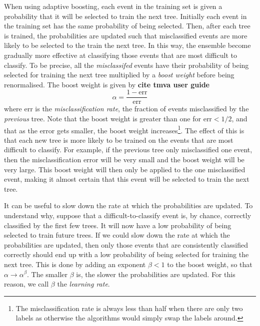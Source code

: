 \documentclass[11pt]{cuthesis}
\begin{document}
When using adaptive boosting, each event in the training set is given a probability that it will be selected to train the next tree. Initially each event in the training set has the same probability of being selected. Then, after each tree is trained, the probabilities are updated such that misclassified events are more likely to be selected to the train the next tree. In this way, the ensemble become gradually more effective at classifying those events that are most difficult to classify. To be precise, all the \textit{misclassifed} events have their probability of being selected for training the next tree multiplied by a \textit{boost weight} before being renormalised. The boost weight is given by \textbf{cite tmva user guide}
\begin{equation}
\alpha = \frac{1 - \text{err}}{\text{err}} 
\end{equation}
where err is the \textit{misclassification rate}, the fraction of events misclassified by the \textit{previous} tree. Note that the boost weight is greater than one for err$<1/2$, and that as the error gets smaller, the boost weight increases\footnote{The misclassification rate is always less than half when there are only two labels as otherwise the algorithms would simply swap the labels around.}. The effect of this is that each new tree is more likely to be trained on the events that are most difficult to classify. For example, if the previous tree only misclassified one event, then the misclassification error will be very small and the boost weight will be very large. This boost weight will then only be applied to the one misclassified event, making it almost certain that this event will be selected to train the next tree. 

It can be useful to slow down the rate at which the probabilities are updated. To understand why, suppose that a difficult-to-classify event is, by chance, correctly classified by the first few trees. It will now have a low probability of being selected to train future trees. If we could slow down the rate at which the probabilities are updated, then only those events that are consistently classified correctly should end up with a low probability of being selected for training the next tree. This is done by adding an exponent $\beta<1$ to the boost weight, so that $\alpha \rightarrow \alpha^\beta$. The smaller $\beta$ is, the slower the probabilities are updated. For this reason, we call $\beta$ the \textit{learning rate}.
\end{document}
